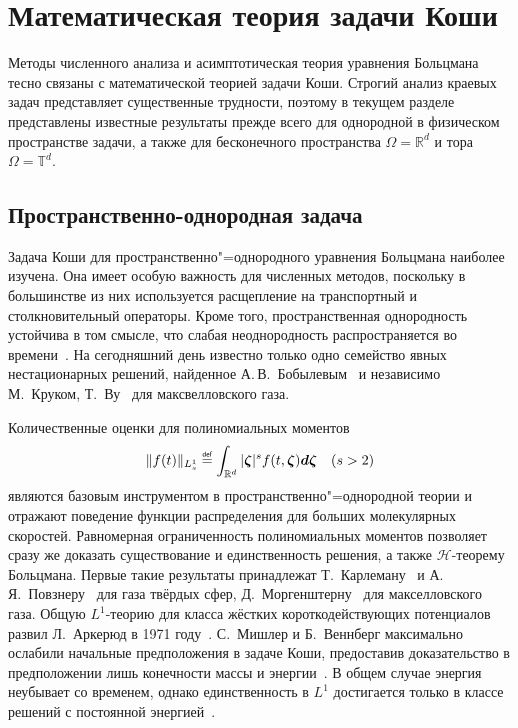 \section{Математическая теория задачи Коши} \label{sect:cauchy}

Методы численного анализа и асимптотическая теория уравнения Больцмана тесно связаны
с математической теорией задачи Коши.
Строгий анализ краевых задач представляет существенные трудности, поэтому в текущем разделе
представлены известные результаты прежде всего для однородной в физическом пространстве задачи,
а также для бесконечного пространства \(\Omega=\mathbb{R}^d\) и тора \(\Omega=\mathbb{T}^d\).

\subsection{Пространственно-однородная задача}

Задача Коши для пространственно"=однородного уравнения Больцмана наиболее изучена.
Она имеет особую важность для численных методов, поскольку в большинстве из них используется
расщепление на транспортный и столкновительный операторы.
Кроме того, пространственная однородность устойчива в том смысле, что
слабая неоднородность распространяется во времени~\cite{Arkeryd1987}.
На сегодняшний день известно только одно семейство явных нестационарных решений,
найденное А.\,В.~Бобылевым~\cite{Bobylev1975} и независимо М.~Круком, Т.~Ву~\cite{Krook1976} для максвелловского газа.

Количественные оценки для полиномиальных моментов
\begin{equation*}
    \|f(t)\|_{L^1_s} \eqdef \int_{\mathbb{R}^d} |\bzeta|^s f(t,\bzeta)\dzeta \quad (s>2)
\end{equation*}
являются базовым инструментом в пространственно"=однородной теории
и отражают поведение функции распределения для больших молекулярных скоростей.
Равномерная ограниченность полиномиальных моментов позволяет сразу же доказать
существование и единственность решения, а также \(\mathcal{H}\)-теорему Больцмана.
Первые такие результаты принадлежат Т.~Карлеману~\cite{Carleman1933} и А.\,Я.~Повзнеру~\cite{Povzner1962}
для газа твёрдых сфер, Д.~Моргенштерну~\cite{Morgenstern1954} для макселловского газа.
Общую \(L^1\)-теорию для класса жёстких короткодействующих потенциалов развил Л.~Аркерюд в 1971 году~\cite{Arkeryd1972}.
С.~Мишлер и Б.~Веннберг максимально ослабили начальные предположения в задаче Коши,
предоставив доказательство в предположении лишь конечности массы и энергии~\cite{Mischler1999}.
В общем случае энергия неубывает со временем, однако единственность в \(L^1\) достигается
только в классе решений с постоянной энергией~\cite{Wennberg1999}.


